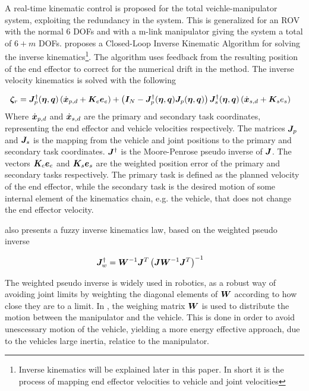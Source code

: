 A real-time kinematic control is proposed for the total veichle-manipulator system, exploiting the redundancy in the system. This is generalized for an ROV with the normal 6 DOFs and with a m-link manipulator giving the system a total of $6+m$ DOFs. 
\cite{antonelli1} proposes a Closed-Loop Inverse Kinematic Algorithm for solving the inverse kinematics\footnote{Inverse kinematics will be explained later in this paper. In short it is the process of mapping end effector velocities to vehicle and joint velocities}. The algorithm uses feedback from the resulting position of the end effector to correct for the numerical drift in the method. The inverse velocity kinematics is solved with the following

\begin{align}
\label{eq:antIK}
\boldsymbol \zeta_r &=\boldsymbol J_{p}^{\dagger}(\boldsymbol \eta,\boldsymbol q) \left( \dot{\boldsymbol x}_{p,d} + \boldsymbol K_{e} \boldsymbol e_{e} \right) + \left( \boldsymbol I_N - \boldsymbol J_{p}^\dagger(\boldsymbol \eta,\boldsymbol q) \boldsymbol J_{p}(\boldsymbol \eta,\boldsymbol q)  \right)\boldsymbol J_{s}^\dagger(\boldsymbol \eta,\boldsymbol q) \left(\dot{\boldsymbol x}_{s,d} + \boldsymbol K_{s}e_{s} \right)
\end{align}
Where $ \dot{\boldsymbol x}_{p,d}$ and  $ \dot{\boldsymbol x}_{s,d}$ are the primary and secondary task coordinates, representing the end effector and vehicle velocities respectively. The matrices $\boldsymbol J_p$ and $ \boldsymbol J_s $ is the mapping from the vehicle and joint positions to the primary and secondary task coordinates. $\boldsymbol J^{\dagger}$ is the Moore-Penrose pseudo inverse of $\boldsymbol J$. The vectors $\boldsymbol K_{e}\boldsymbol e_{e}$ and $ \boldsymbol K_{s}\boldsymbol e_{s}$ are the weighted  position error of the primary and secondary tasks respectively.
The primary task is defined as the planned velocity of the end effector, while the secondary task is the desired motion of some internal element of the kinematics chain, e.g. the vehicle, that does not change the end effector velocity.

\cite{antonelli1} also presents a fuzzy inverse kinematics law, based on the weighted pseudo inverse

\begin{align}
	\boldsymbol J_{w}^{\dagger} &= \boldsymbol W^{-1} \boldsymbol J^{T} \left( \boldsymbol J \boldsymbol W^{-1}\boldsymbol J^{T} \right)^{-1}
	\label{eq:wpseudo}
\end{align}

The weighted pseudo inverse is widely used in robotics, as a robust way of avoiding joint limits by weighting the diagonal elements of $\boldsymbol W$ according to how close they are to a limit. In \cite{antonelli1}, the weighing matrix $\boldsymbol W$ is used to distribute the motion between the manipulator and the vehicle. This is done in order to avoid unescessary motion of the vehicle, yielding a more energy effective approach, due to the vehicles large inertia, relatice to the manipulator.

